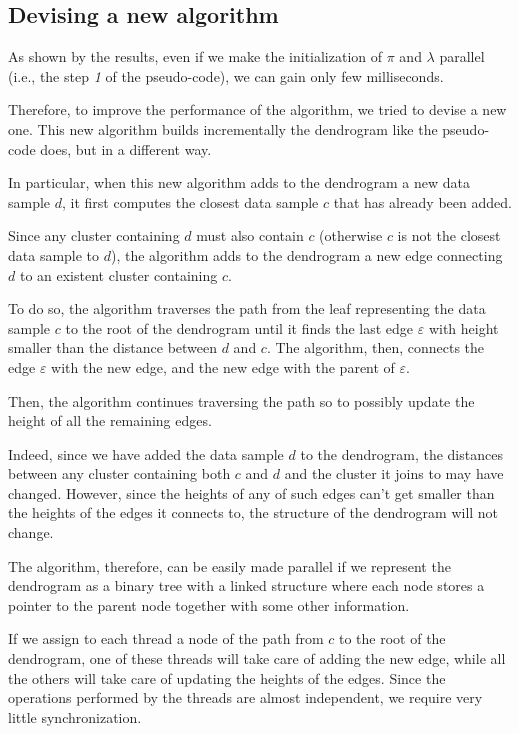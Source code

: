 \documentclass{article}
\begin{document}
\vspace{-10pt}

\hypertarget{failed-attempt}{
\subsection{Devising a new algorithm}
\label{failed-attempt}}

As shown by the results, even if we make the initialization of $\pi$ and $\lambda$ parallel (i.e., the step \textit{1} of the pseudo-code), we can gain only few milliseconds.

Therefore, to improve the performance of the algorithm, we tried to devise a new one. This new algorithm
builds incrementally the dendrogram like the pseudo-code does, but in a different way.

In particular, when this new algorithm adds to the dendrogram a new data sample $d$, it first
computes the closest data sample $c$ that has already been added.

Since any cluster containing $d$ must also contain $c$ (otherwise $c$ is not the closest data
sample to $d$), the algorithm adds to the dendrogram a new edge connecting $d$ to an existent cluster containing $c$.

To do so, the algorithm traverses the path from the leaf
representing the data sample $c$ to the root of the dendrogram until it finds the last edge
$\varepsilon$ with height smaller than the distance between $d$ and $c$.
The algorithm, then, connects the edge $\varepsilon$ with the new edge, and the new edge with the
parent of $\varepsilon$.

Then, the algorithm continues traversing the path so to possibly update the height of all the
remaining edges.

Indeed, since we have added the data sample $d$ to the dendrogram, the distances between
any cluster containing both $c$ and $d$ and the cluster it joins to may have changed.
However, since the heights of any of such edges can't get smaller than the heights of
the edges it connects to, the structure of the dendrogram will not change.

The algorithm, therefore, can be easily made parallel if we represent the dendrogram as a binary tree with a
linked structure where each node stores a pointer to the parent node together with some other
information.

If we assign to each thread a node of the path from $c$ to the root of the
dendrogram, one of these threads will take care of adding the new edge, while all the others will
take care of updating the heights of the edges.
Since the operations performed by the threads are almost independent, we require very little
synchronization.
\end{document}
